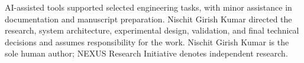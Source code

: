 \documentclass[sigconf,nonacm]{acmart}
\begin{document}
\begin{acks}
AI-assisted tools supported selected engineering tasks, with minor assistance in documentation and manuscript preparation. Nischit Girish Kumar directed the research, system architecture, experimental design, validation, and final technical decisions and assumes responsibility for the work. Nischit Girish Kumar is the sole human author; NEXUS Research Initiative denotes independent research.
\end{acks}


\end{document}
